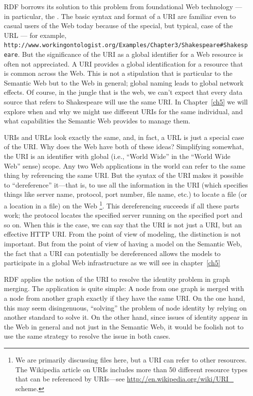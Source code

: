 RDF borrows its solution to this problem from foundational Web
technology --- in particular, the . The basic syntax and format of a URI are
familiar even to casual users of the Web today because of the special,
but typical, case of the URL --- for example,
\texttt{http://www.workingontologist.org/Examples/Chapter3/Shakespeare\#Shakespeare}. 
But the significance of the URI as a
global identifier for a Web resource is often not appreciated. A URI
provides a global identification for a resource that is common across
the Web. This is not a stipulation that is particular to the Semantic
Web but to the Web in general; global naming leads to global network
effects. Of course, in the jungle that is the web, we can't expect that
every data source that refers to Shakespeare will use the same URI.  In
Chapter~\ref{ch5} we will explore when and why we might use different URIs for
the same individual, and what capabilities the Semantic Web provides to
manage them.

URIs and URLs look exactly the same, and, in fact, a URL is just a
special case of the URI. Why does the Web have both of these ideas?
Simplifying somewhat, the URI is an identifier with global (i.e.,
``World Wide'' in the ``World Wide Web'' sense) scope. Any two Web
applications in the world can refer to the same thing by referencing the
same URI. But the syntax of the URI makes it possible to ``dereference''
it---that is, to use all the information in the URI (which specifies
things like server name, protocol, port number, file name, etc.) to
locate a file (or a location in a file) on the Web \footnote{We are primarily discussing files here, but a URI can refer to other
resources. The Wikipedia article on URIs includes more than 50 different
resource types that can be referenced by URIs---see
\url{http://en.wikipedia.org/wiki/URI_} scheme.}. This
dereferencing succeeds if all these parts work; the protocol locates the
specified server running on the specified port and so on. When this is
the case, we can say that the URI is not just a URI, but an effective
HTTP URI. From the point of view of modeling, the distinction is not
important. But from the point of view of having a model on the Semantic
Web, the fact that a URI can potentially be dereferenced allows the
models to participate in a global Web infrastructure as we will see in
chapter~\ref{ch5}

RDF applies the notion of the URI to resolve the identity problem in
graph merging. The application is quite simple: A node from one graph is
merged with a node from another graph exactly if they have the same
URI. On the one hand, this may seem disingenuous, ``solving'' the
problem of node identity by relying on another standard to solve it. On
the other hand, since issues of identity appear in the Web in general
and not just in the Semantic Web, it would be foolish not to use the
same strategy to resolve the issue in both cases.

